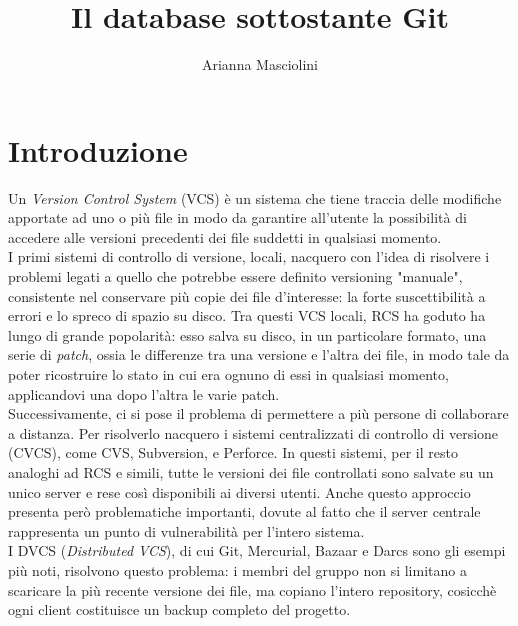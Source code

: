 \documentclass[12pt]{article}
\title{Il database sottostante Git}
\author{Arianna Masciolini}
\begin{document}
\maketitle
\newpage
\tableofcontents
\newpage
\section{Introduzione}
Un \textit{Version Control System} (VCS) è un sistema che tiene traccia delle modifiche apportate ad uno o più file in modo da garantire all'utente la possibilità di accedere alle versioni precedenti dei file suddetti in qualsiasi momento. 
\bigskip \\
I primi sistemi di controllo di versione, locali, nacquero con l'idea di risolvere i problemi legati a quello che potrebbe essere definito versioning "manuale", consistente nel conservare più copie dei file d'interesse: la forte suscettibilità a errori e lo spreco di spazio su disco. Tra questi VCS locali, RCS ha goduto ha lungo di grande popolarità: esso salva su disco, in un particolare formato, una serie di \textit{patch}, ossia le differenze tra una versione e l'altra dei file, in modo tale da poter ricostruire lo stato in cui era ognuno di essi in qualsiasi momento, applicandovi una dopo l'altra le varie patch.
\bigskip \\
Successivamente, ci si pose il problema di permettere a più persone di collaborare a distanza. Per risolverlo nacquero i sistemi centralizzati di controllo di versione (CVCS), come CVS, Subversion, e Perforce. In questi sistemi, per il resto analoghi ad RCS e simili, tutte le versioni dei file controllati sono salvate su un unico server e rese così disponibili ai diversi utenti. Anche questo approccio presenta però problematiche importanti, dovute al fatto che il server centrale rappresenta un punto di vulnerabilità per l'intero sistema. 
\bigskip \\
I DVCS (\textit{Distributed VCS}), di cui Git, Mercurial, Bazaar e Darcs sono gli esempi più noti, risolvono questo problema: i membri del gruppo non si limitano a scaricare la più recente versione dei file, ma copiano l'intero repository, cosicchè ogni client costituisce un backup completo del progetto.
\end{document}
